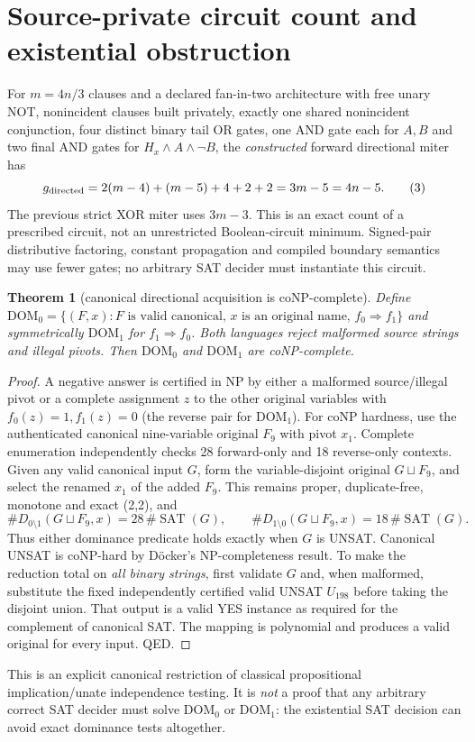 \documentclass[11pt]{article}
\newtheorem{theorem}{Theorem}
\begin{document}
\section{Source-private circuit count and existential obstruction}
For $m=4n/3$ clauses and a declared fan-in-two architecture with free unary NOT, nonincident clauses built privately, exactly one shared nonincident conjunction, four distinct binary tail OR gates, one AND gate each for $A,B$ and two final AND gates for $H_x\wedge A\wedge\neg B$, the \emph{constructed} forward directional miter has
\[
g_{\rm directed}=2(m-4)+(m-5)+4+2+2=3m-5=4n-5.
\tag{3}
\]
The previous strict XOR miter uses $3m-3$. This is an exact count of a prescribed circuit, not an unrestricted Boolean-circuit minimum. Signed-pair distributive factoring, constant propagation and compiled boundary semantics may use fewer gates; no arbitrary SAT decider must instantiate this circuit.

\begin{theorem}[canonical directional acquisition is coNP-complete]
Define $\mathrm{DOM}_0=\{(F,x):F\text{ is valid canonical, }x\text{ is an original name, }f_0\Rightarrow f_1\}$ and symmetrically $\mathrm{DOM}_1$ for $f_1\Rightarrow f_0$. Both languages reject malformed source strings and illegal pivots. Then $\mathrm{DOM}_0$ and $\mathrm{DOM}_1$ are coNP-complete.
\end{theorem}
\begin{proof}
A negative answer is certified in NP by either a malformed source/illegal pivot or a complete assignment $z$ to the other original variables with $f_0(z)=1,f_1(z)=0$ (the reverse pair for $\mathrm{DOM}_1$). For coNP hardness, use the authenticated canonical nine-variable original $F_9$ with pivot $x_1$. Complete enumeration independently checks 28 forward-only and 18 reverse-only contexts. Given any valid canonical input $G$, form the variable-disjoint original $G\sqcup F_9$, and select the renamed $x_1$ of the added $F_9$. This remains proper, duplicate-free, monotone and exact (2,2), and
\[
\#D_{0\setminus1}(G\sqcup F_9,x)=28\,\#\operatorname{SAT}(G),\qquad
\#D_{1\setminus0}(G\sqcup F_9,x)=18\,\#\operatorname{SAT}(G).
\tag{4}
\]
Thus either dominance predicate holds exactly when $G$ is UNSAT. Canonical UNSAT is coNP-hard by D\"ocker's NP-completeness result. To make the reduction total on \emph{all binary strings}, first validate $G$ and, when malformed, substitute the fixed independently certified valid UNSAT $U_{198}$ before taking the disjoint union. That output is a valid YES instance as required for the complement of canonical SAT. The mapping is polynomial and produces a valid original for every input. QED.
\end{proof}
\noindent This is an explicit canonical restriction of classical propositional implication/unate independence testing. It is \emph{not} a proof that any arbitrary correct SAT decider must solve $\mathrm{DOM}_0$ or $\mathrm{DOM}_1$: the existential SAT decision can avoid exact dominance tests altogether.
\end{document}
